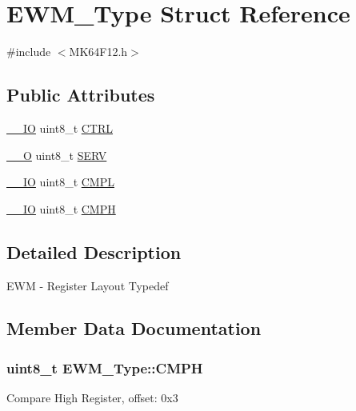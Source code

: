\hypertarget{structEWM__Type}{}\section{E\+W\+M\+\_\+\+Type Struct Reference}
\label{structEWM__Type}


{\ttfamily \#include $<$M\+K64\+F12.\+h$>$}

\subsection*{Public Attributes}
\begin{DoxyCompactItemize}
\item 
\hyperlink{core__sc300_8h_aec43007d9998a0a0e01faede4133d6be}{\+\_\+\+\_\+\+IO} uint8\+\_\+t \hyperlink{structEWM__Type_a34e0683325e0f6e1eff6c5429087c5b3}{C\+T\+RL}
\item 
\hyperlink{core__sc300_8h_a7e25d9380f9ef903923964322e71f2f6}{\+\_\+\+\_\+O} uint8\+\_\+t \hyperlink{structEWM__Type_a8b8265f982b05d0280305caedc159e37}{S\+E\+RV}
\item 
\hyperlink{core__sc300_8h_aec43007d9998a0a0e01faede4133d6be}{\+\_\+\+\_\+\+IO} uint8\+\_\+t \hyperlink{structEWM__Type_a9b687b81f145fcac20991b7302df9f55}{C\+M\+PL}
\item 
\hyperlink{core__sc300_8h_aec43007d9998a0a0e01faede4133d6be}{\+\_\+\+\_\+\+IO} uint8\+\_\+t \hyperlink{structEWM__Type_a940a0c8d92c5a00f70deb5b198980e43}{C\+M\+PH}
\end{DoxyCompactItemize}


\subsection{Detailed Description}
E\+WM -\/ Register Layout Typedef 

\subsection{Member Data Documentation}
\subsubsection[{\texorpdfstring{C\+M\+PH}{CMPH}}]{ uint8\+\_\+t E\+W\+M\+\_\+\+Type\+::\+C\+M\+PH}\hypertarget{structEWM__Type_a940a0c8d92c5a00f70deb5b198980e43}{}\label{structEWM__Type_a940a0c8d92c5a00f70deb5b198980e43}
Compare High Register, offset\+: 0x3 
